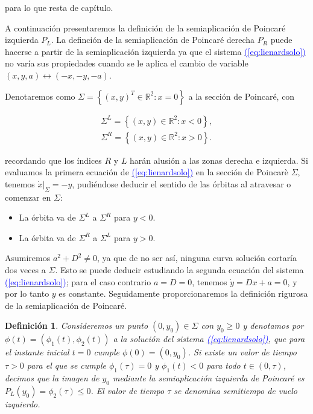\documentclass[12pt,a4paper]{report} %
\newtheorem{definicion}{Definición}[chapter]
\newcommand{\eref}[1]{\hyperref[#1]{\textcolor{blue}{(\ref*{#1})}}}
\begin{document}
	\noindent para lo que resta de capítulo.
	
		\vspace{0.5cm} A continuación presentaremos la definición de la semiaplicación de Poincaré izquierda $P_L$. La definción de la semiaplicación de Poincaré derecha $P_R$ puede hacerse a partir de la semiaplicación izquierda ya que el sistema \eref{eq:lienardsolo} no varía sus propiedades cuando se le aplica el cambio de variable $(x,y,a)\longleftrightarrow(-x,-y,-a)$. 
	
	\newpage
	
	Denotaremos como $\varSigma=\left\{(x,y)^T\in \mathbb{R}^2:x=0\right\}$ a la sección de Poincaré, con
	
	\begin{equation*}
		\begin{aligned}
			\varSigma^L = \left\{ (x,y)\in\mathbb{R}^2:x<0 \right\}, \\[3mm]
			\varSigma^R = \left\{ (x,y)\in\mathbb{R}^2:x>0 \right\}.
		\end{aligned}
	\end{equation*}\smallskip
	
	\noindent recordando que los índices $R$ y $L$ harán alusión a las zonas derecha e izquierda. Si evaluamos la primera ecuación de \eref{eq:lienardsolo} en la sección de Poincarè $\varSigma$, tenemos $\dot{x}|_{\varSigma}=-y$, pudiéndose deducir el sentido de las órbitas al atravesar o comenzar en $\varSigma$:
	
	\begin{itemize}
		\item La órbita va de $\varSigma^L$ a $\varSigma^R$ para $y<0$.
		\item La órbita va de $\varSigma^R$ a $\varSigma^L$ para $y>0$.
	\end{itemize}\smallskip
	
	 Asumiremos $a^2+D^2\neq0$, ya que de no ser así, ninguna curva solución cortaría dos veces a $\varSigma$. Esto se puede deducir estudiando la segunda ecuación del sistema \eref{eq:lienardsolo}; para el caso contrario $a=D=0$, tenemos $\dot{y}=Dx+a=0$, y por lo tanto $y$ es constante. Seguidamente proporcionaremos la definición rigurosa de la semiaplicación de Poincaré.

	\vspace{0.5cm}
	\begin{definicion}
		\label{def6}
		Consideremos un punto $(0,y_0)\in \varSigma$ con $y_0\geq0$ y denotamos por $\phi(t)=(\phi_1(t),\phi_2(t))$ a la solución del sistema \eref{eq:lienardsolo}, que para el instante inicial $t=0$ cumple $\phi(0)=(0,y_0)$. Si existe un valor de tiempo $\tau>0$ para el que se cumple $\phi_1(\tau)=0$ y $\phi_1(t)<0$ para todo $t\in(0,\tau)$, decimos que la imagen de $y_0$ mediante la semiaplicación izquierda de Poincaré es $P_L(y_0)=\phi_2(\tau)\leq0$. El valor de tiempo $\tau$ se denomina semitiempo de vuelo izquierdo.
	\end{definicion}
	
\end{document}
